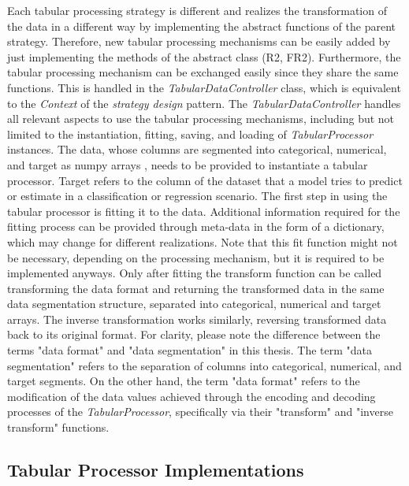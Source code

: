 Each tabular processing strategy is different and realizes the transformation of the data in a different way by implementing the abstract functions of the parent strategy.
Therefore, new tabular processing mechanisms can be easily added by just implementing the methods of the abstract class (R2, FR2).
Furthermore, the tabular processing mechanism can be exchanged easily since they share the same functions.
This is handled in the \textit{TabularDataController} class, which is equivalent to the \textit{Context} of the \textit{strategy design} pattern.
The \textit{TabularDataController} handles all relevant aspects to use the tabular processing mechanisms, including but not limited to the instantiation, fitting, saving, and loading of \textit{TabularProcessor} instances.
The data, whose columns are segmented into categorical, numerical, and target as numpy arrays \cite{harris2020array}, needs to be provided to instantiate a tabular processor.
Target refers to the column of the dataset that a model tries to predict or estimate in a classification or regression scenario.
The first step in using the tabular processor is fitting it to the data.
Additional information required for the fitting process can be provided through meta-data in the form of a dictionary, which may change for different realizations.
Note that this fit function might not be necessary, depending on the processing mechanism, but it is required to be implemented anyways.
Only after fitting the transform function can be called transforming the data format and returning the transformed data in the same data segmentation structure, \ie separated into categorical, numerical and target arrays.
The inverse transformation works similarly, reversing transformed data back to its original format.
For clarity, please note the difference between the terms "data format" and "data segmentation" in this thesis.
The term "data segmentation" refers to the separation of columns into categorical, numerical, and target segments.
On the other hand, the term "data format" refers to the modification of the data values achieved through the encoding and decoding processes of the \textit{TabularProcessor}, specifically via their "transform" and "inverse transform" functions.

\subsection{Tabular Processor Implementations}
\label{ch:architecture-tabularProcessor-implementations}

